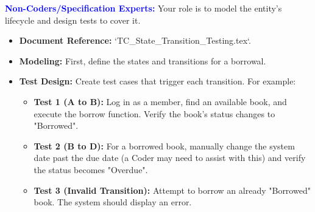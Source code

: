 \documentclass{article}
\newcommand{\role}[1]{\textbf{\textcolor{blue}{#1:}}}
\begin{document}
\role{Non-Coders/Specification Experts}
Your role is to model the entity's lifecycle and design tests to cover it.
\begin{itemize}
    \item \textbf{Document Reference:} `TC\_State\_Transition\_Testing.tex`.
    \item \textbf{Modeling:} First, define the states and transitions for a borrowal.
    
    \begin{center}
    \end{center}
    
    \item \textbf{Test Design:} Create test cases that trigger each transition. For example:
    \begin{itemize}
        \item \textbf{Test 1 (A to B):} Log in as a member, find an available book, and execute the borrow function. Verify the book's status changes to "Borrowed".
        \item \textbf{Test 2 (B to D):} For a borrowed book, manually change the system date past the due date (a Coder may need to assist with this) and verify the status becomes "Overdue".
        \item \textbf{Test 3 (Invalid Transition):} Attempt to borrow an already "Borrowed" book. The system should display an error.
    \end{itemize}
\end{itemize}
\end{document}
